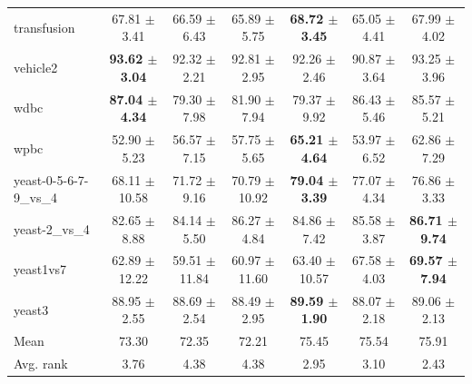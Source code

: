 \begin{table}[t]
\begin{tabular}{lcccccc}
transfusion & 67.81 $\pm$ 3.41 & 66.59 $\pm$ 6.43 & 65.89 $\pm$ 5.75 & \textbf{68.72 $\pm$ 3.45} & 65.05 $\pm$ 4.41 & 67.99 $\pm$ 4.02 \\
vehicle2 & \textbf{93.62 $\pm$ 3.04} & 92.32 $\pm$ 2.21 & 92.81 $\pm$ 2.95 & 92.26 $\pm$ 2.46 & 90.87 $\pm$ 3.64 & 93.25 $\pm$ 3.96 \\
wdbc & \textbf{87.04 $\pm$ 4.34} & 79.30 $\pm$ 7.98 & 81.90 $\pm$ 7.94 & 79.37 $\pm$ 9.92 & 86.43 $\pm$ 5.46 & 85.57 $\pm$ 5.21 \\
wpbc & 52.90 $\pm$ 5.23 & 56.57 $\pm$ 7.15 & 57.75 $\pm$ 5.65 & \textbf{65.21 $\pm$ 4.64} & 53.97 $\pm$ 6.52 & 62.86 $\pm$ 7.29 \\
yeast-0-5-6-7-9\_vs\_4 & 68.11 $\pm$ 10.58 & 71.72 $\pm$ 9.16 & 70.79 $\pm$ 10.92 & \textbf{79.04 $\pm$ 3.39} & 77.07 $\pm$ 4.34 & 76.86 $\pm$ 3.33 \\
yeast-2\_vs\_4 & 82.65 $\pm$ 8.88 & 84.14 $\pm$ 5.50 & 86.27 $\pm$ 4.84 & 84.86 $\pm$ 7.42 & 85.58 $\pm$ 3.87 & \textbf{86.71 $\pm$ 9.74} \\
yeast1vs7 & 62.89 $\pm$ 12.22 & 59.51 $\pm$ 11.84 & 60.97 $\pm$ 11.60 & 63.40 $\pm$ 10.57 & 67.58 $\pm$ 4.03 & \textbf{69.57 $\pm$ 7.94} \\
yeast3 & 88.95 $\pm$ 2.55 & 88.69 $\pm$ 2.54 & 88.49 $\pm$ 2.95 & \textbf{89.59 $\pm$ 1.90} & 88.07 $\pm$ 2.18 & 89.06 $\pm$ 2.13 \\
\midrule
Mean & 73.30 & 72.35 & 72.21 & 75.45 & 75.54 & 75.91 \\
Avg. rank & 3.76 & 4.38 & 4.38 & 2.95 & 3.10 & 2.43 \\
\bottomrule
\end{tabular}
\end{table}